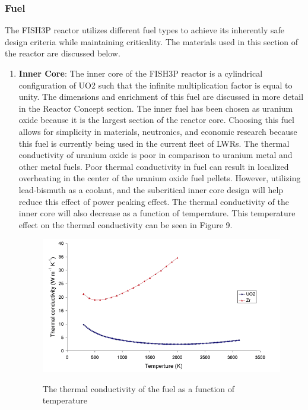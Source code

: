 \documentclass[12pt]{article}
\begin{document}
\subsubsection{Fuel}
The FISH3P reactor utilizes different fuel types to achieve its inherently safe design criteria while maintaining criticality.  The materials used in this section of the reactor are discussed below.
\begin{enumerate}
\item \textbf{Inner Core}: \newline
	The inner core of the FISH3P reactor is a cylindrical configuration of UO2 such that the infinite multiplication factor is equal to unity.  The dimensions and enrichment of this fuel are discussed in more detail in the Reactor Concept section.  The inner fuel has been chosen as uranium oxide because it is the largest section of the reactor core.  Choosing this fuel allows for simplicity in materials, neutronics, and economic research because this fuel is currently being used in the current fleet of LWRs.  
	The thermal conductivity of uranium oxide is poor in comparison to uranium metal and other metal fuels.  Poor thermal conductivity in fuel can result in localized overheating in the center of the uranium oxide fuel pellets.  However, utilizing lead-bismuth as a coolant, and the subcritical inner core design will help reduce this effect of power peaking effect.  The thermal conductivity of the inner core will also decrease as a function of temperature.  This temperature effect on the thermal conductivity can be seen in Figure 9.

\begin{figure}[H]                                  
   \centering                                     
    \includegraphics[width=1\textwidth]{themal_cond}   
    \caption{The thermal conductivity of the fuel as a function of temperature} \cite{iaea}        
    \label{fig:mesh1}     
\end{figure}   


\end{enumerate}
\end{document}

